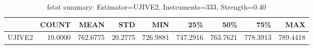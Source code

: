 \begin{table}[ht]
\centering
\caption{fstat summary: Estimator=UJIVE2, Instruments=333, Strength=0.40}
\begin{tabular}{lrrrrrrrr}
\toprule
 & COUNT & MEAN & STD & MIN & 25\% & 50\% & 75\% & MAX \\
\midrule
UJIVE2 & 10.0000 & 762.6775 & 20.2775 & 726.9881 & 747.2916 & 763.7621 & 778.3913 & 789.4418 \\
\bottomrule
\end{tabular}
\end{table}
